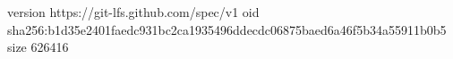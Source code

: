 version https://git-lfs.github.com/spec/v1
oid sha256:b1d35e2401faedc931bc2ca1935496ddecdc06875baed6a46f5b34a55911b0b5
size 626416
